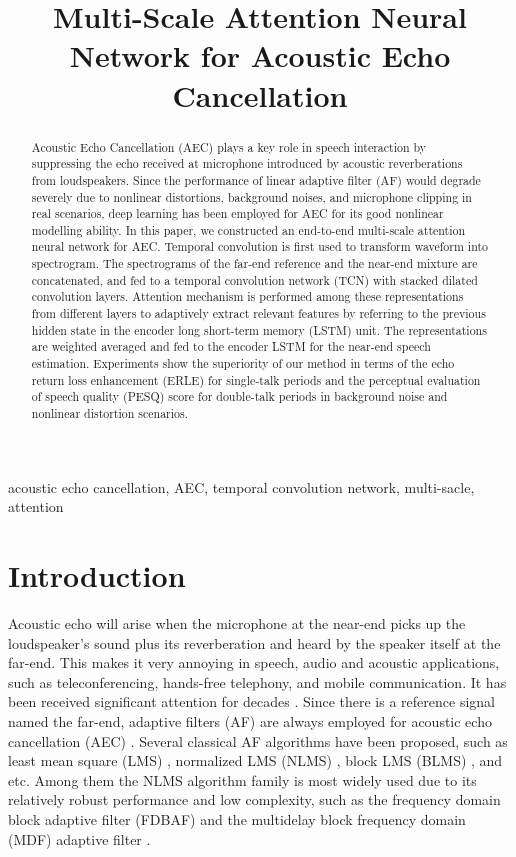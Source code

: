 \documentclass{article}
\title{Multi-Scale Attention Neural Network for Acoustic Echo Cancellation}
\begin{document}
\ninept
\maketitle

\begin{sloppy}

\begin{abstract}
  Acoustic Echo Cancellation (AEC) plays a key role in speech interaction by suppressing the echo received at microphone introduced by acoustic reverberations from loudspeakers. Since the performance of linear adaptive filter (AF) would degrade severely due to nonlinear distortions, background noises, and microphone clipping in real scenarios, deep learning has been employed for AEC for its good nonlinear modelling ability. In this paper, we constructed an end-to-end multi-scale attention neural network for AEC. Temporal convolution is first used to transform waveform into spectrogram. The spectrograms of the far-end reference and the near-end mixture are concatenated, and fed to a temporal convolution network (TCN) with stacked dilated convolution layers. Attention mechanism is performed among these representations from different layers to adaptively extract relevant features by referring to the previous hidden state in the encoder long short-term memory (LSTM) unit. The representations are weighted averaged and fed to the encoder LSTM for the near-end speech estimation. Experiments show the superiority of our method in terms of the echo return loss enhancement (ERLE) for single-talk periods and the perceptual evaluation of speech quality (PESQ) score for double-talk periods in background noise and nonlinear distortion scenarios.
\end{abstract}

\begin{keywords}
acoustic echo cancellation, AEC, temporal convolution network, multi-sacle, attention
\end{keywords}

\section{Introduction}
\label{sec:intro}

Acoustic echo will arise when the microphone at the near-end picks up the loudspeaker's sound plus its reverberation and heard by the speaker itself at the far-end. This makes it very annoying in speech, audio and acoustic applications, such as teleconferencing, hands-free telephony, and mobile communication. It has been received significant attention for decades \cite{Sondhi,Benesty}. Since there is a reference signal named the far-end, adaptive filters (AF) are always employed for acoustic echo cancellation (AEC) \cite{Breining}. Several classical AF algorithms have been proposed, such as least mean square (LMS) \cite{FLMS}, normalized LMS (NLMS) \cite{NLMS}, block LMS (BLMS) \cite{BLMS}, and etc. Among them the NLMS algorithm family is most widely used due to its relatively robust performance and low complexity, such as the frequency domain block adaptive filter (FDBAF) \cite{PBFDAF} and the multidelay block frequency domain (MDF) adaptive filter \cite{MDF}.


\end{sloppy}
\end{document}
